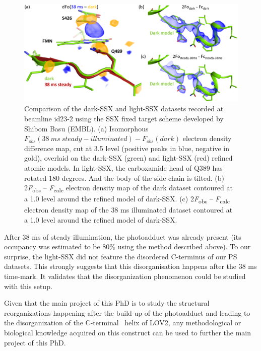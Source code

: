\begin{figure}[H] %
    \centering
     \includegraphics[width=\textwidth]{images/LOV2/SSX.pdf}
    \hfill
    \caption{Comparison of the dark-SSX and light-SSX datasets recorded at beamline id23-2 using the SSX fixed target scheme developed by Shibom Basu (EMBL). (a) Isomorphous \(F_{obs}(38\ ms\ steady-illuminated) - F_{obs}(dark)\) electron density difference map, cut at 3.5 \textsigma level (positive peaks in blue, negative in gold), overlaid on the dark-SSX (green) and light-SSX (red) refined atomic models. In light-SSX, the carboxamide head of Q389 has rotated 180 degrees. And the body of the side chain is tilted. (b) 2\textit{F}\textsubscript{obs} – \textit{F}\textsubscript{calc} electron density map of the dark dataset contoured at a 1.0 \textsigma level around the refined model of dark-SSX. (c) 2\textit{F}\textsubscript{obs} – \textit{F}\textsubscript{calc} electron density map of the 38 ms illuminated dataset contoured at a 1.0 \textsigma level around the refined model of dark-SSX.}
    \label{fig:SSX}
\end{figure}

After 38 ms of steady illumination, the photoadduct was already present (its occupancy was estimated to be 80\% using the method described above). To our surprise, the light-SSX did not feature the disordered C-terminus of our PS datasets. This strongly suggests that this disorganisation happens after the 38 ms time-mark. It validates that the disorganization phenomenon could be studied with this setup.

Given that the main project of this PhD is to study the structural reorganizations happening after the build-up of the photoadduct and leading to the disorganization of the C-terminal \textalpha\ helix of LOV2, any methodological or biological knowledge acquired on this construct can be used to further the main project of this PhD.





